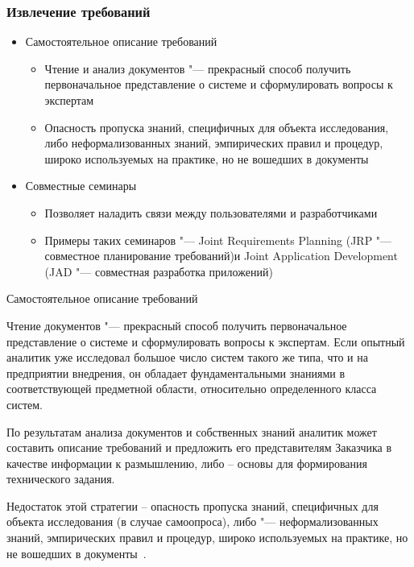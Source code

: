 \documentclass{../industrial-development}
\begin{document}
\begin{frame} \frametitle{Извлечение требований}
\begin{itemize}

\item \alert{Самостоятельное описание требований}
\begin{itemize} 
\item Чтение и анализ документов "--- прекрасный способ получить первоначальное представление о системе и сформулировать вопросы к экспертам
\item Опасность пропуска знаний, специфичных для объекта исследования, либо неформализованных знаний, эмпирических правил и процедур, широко используемых на практике, но не вошедших в документы
\end{itemize}

\item \alert{Совместные семинары}
\begin{itemize} 
\item Позволяет наладить связи между пользователями и разработчиками
\item Примеры таких семинаров "--- Joint Requirements Planning (JRP "--- совместное планирование требований)и Joint Application Development (JAD "--- совместная разработка приложений)
\end{itemize}

\end{itemize}
\end{frame}
\lecturenotes

\alert{Самостоятельное описание требований}

Чтение документов "--- прекрасный способ получить первоначальное представление о системе и сформулировать вопросы к экспертам. Если опытный аналитик уже исследовал большое число систем такого же типа, что и на предприятии внедрения, он обладает фундаментальными знаниями в соответствующей предметной области, относительно определенного класса систем.

По результатам анализа документов и собственных знаний аналитик может составить описание требований и предложить его представителям Заказчика в качестве информации к размышлению, либо – основы для формирования технического задания.

Недостаток этой стратегии – опасность пропуска знаний, специфичных для объекта исследования (в случае самоопроса), либо "--- неформализованных знаний, эмпирических правил и процедур, широко используемых на практике, но не вошедших в документы~\cite[с.~33]{Maglinec}.
\end{document}
